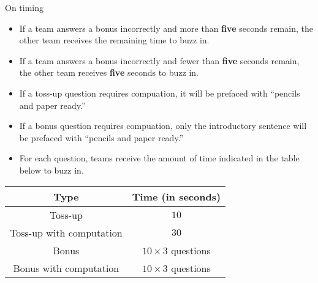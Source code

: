 \documentclass{report}
\begin{document}
\vspace*{0.3 cm}
On timing
\begin{itemize}
    \item If a team answers a bonus incorrectly and more than \textbf{five} seconds remain, the other team receives the remaining time to buzz in.
    \item If a team answers a bonus incorrectly and fewer than \textbf{five} seconds remain, the other team receives \textbf{five} seconds to buzz in.
    \item If a toss-up question requires compuation, it will be prefaced with ``pencils and paper ready.''
    \item If a bonus question requires compuation, only the introductory sentence will be prefaced with ``pencils and paper ready.''
    \item For each question, teams receive the amount of time indicated in the table below to buzz in.

\end{itemize}

\begin{center}
\begin{tabular}{||c|c||} 
    \hline
    Type & Time (in seconds) \\
    \hline\hline
    Toss-up & $10$ \\ 
    \hline
    Toss-up with computation & $30$ \\ 
    \hline
    Bonus & $10\times 3$ questions \\ 
    \hline
    Bonus with computation & $10\times 3$ questions \\
    \hline
\end{tabular}
\end{center}
\end{document}

